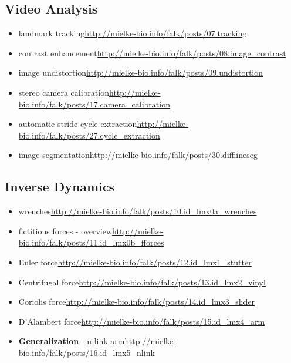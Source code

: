\begin{change}
\subsection{Video Analysis}
\label{sec:org7762123}
\begin{itemize}
\item landmark tracking\newline \url{http://mielke-bio.info/falk/posts/07.tracking}
\item contrast enhancement\newline \url{http://mielke-bio.info/falk/posts/08.image\_contrast}
\item image undistortion\newline \url{http://mielke-bio.info/falk/posts/09.undistortion}
\item stereo camera calibration\newline \url{http://mielke-bio.info/falk/posts/17.camera\_calibration}
\item automatic stride cycle extraction\newline \url{http://mielke-bio.info/falk/posts/27.cycle\_extraction}
\item image segmentation\newline \url{http://mielke-bio.info/falk/posts/30.difflineseg}
\end{itemize}
\subsection{Inverse Dynamics}
\label{sec:org58842e9}
\begin{itemize}
\item wrenches\newline \url{http://mielke-bio.info/falk/posts/10.id\_lmx0a\_wrenches}
\item fictitious forces - overview\newline \url{http://mielke-bio.info/falk/posts/11.id\_lmx0b\_fforces}
\item Euler force\newline \url{http://mielke-bio.info/falk/posts/12.id\_lmx1\_stutter}
\item Centrifugal force\newline \url{http://mielke-bio.info/falk/posts/13.id\_lmx2\_vinyl}
\item Coriolis force\newline \url{http://mielke-bio.info/falk/posts/14.id\_lmx3\_slider}
\item D'Alambert force\newline \url{http://mielke-bio.info/falk/posts/15.id\_lmx4\_arm}
\item \textbf{Generalization} - n-link arm\newline \url{http://mielke-bio.info/falk/posts/16.id\_lmx5\_nlink}
\end{itemize}

\end{change}
